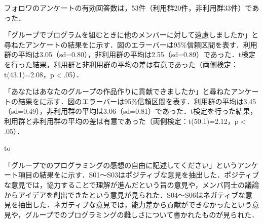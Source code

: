フォロワのアンケートの有効回答数は，53件（利用群20件，非利用群33件）であった．

「グループでプログラムを組むときに他のメンバーに対して遠慮しましたか」と尋ねたアンケートの結果をに示す．図のエラーバーは95\%信頼区間を表す．利用群の平均は3.05（sd=0.80），非利用群の平均は2.55（sd=0.89）であった．t検定を行った結果，利用群と非利用群の平均の差は有意であった（両側検定：t(43.1)=2.08，p$<$.05）．


「あなたはあなたのグループの作品作りに貢献できましたか」と尋ねたアンケートの結果をに示す．図のエラーバーは95\%信頼区間を表す．利用群の平均は3.45（sd=0.49），非利用群の平均は3.06（sd=0.81）であった．t検定を行った結果，利用群と非利用群の平均の差は有意であった（両側検定：t(50.1)=2.12，p$<$.05）．


\begin{table}[tb] 
\caption{グループでのプログラミングの感想} 
\label{tab:free1}
\hbox to
\end{table}


「グループでのプログラミングの感想の自由に記述してください」というアンケート項目の結果をに示す．S01〜S03はポジティブな意見を抽出した．ポジティブな意見では，協力することで理解が進んだという旨の意見や，メンバ同士の議論からアイデアを創出できたという意見が見られた．S04〜S06はネガティブな意見を抽出した．ネガティブな意見では，能力差から貢献ができなかったという意見や，グループでのプログラミングの難しさについて書かれたものが見られた．



